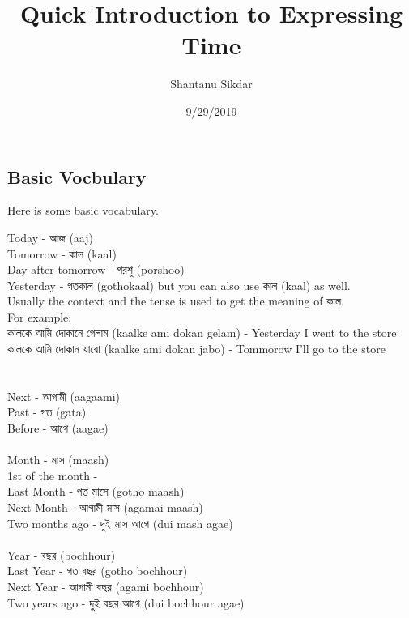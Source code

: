 \documentclass{article}
\title{ Quick Introduction to Expressing Time }
\author{Shantanu Sikdar}
\date{9/29/2019}
\begin{document}
\maketitle


\subsection{Basic Vocbulary}
Here is some basic vocabulary. 

Today - আজ  (aaj) \\
Tomorrow - কাল (kaal) \\
Day after tomorrow - পরশু (porshoo) \\
Yesterday - গতকাল (gothokaal) but you can also use কাল (kaal) as well. \\
Usually the context and the tense is used to get the meaning of কাল. \\
For example: \\
কালকে আমি দোকানে গেলাম (kaalke ami dokan gelam) - Yesterday I went to the store \\
কালকে আমি দোকান যাবো (kaalke ami dokan jabo) - Tommorow I'll go to the store \\
\\
\\
Next - আগামী (aagaami) \\
Past - গত (gata) \\
Before - আগে (aagae) \\
\\
Month - মাস (maash) \\
1st of the month - \\
Last Month - গত মাসে (gotho maash) \\
Next Month - আগামী মাস (agamai maash) \\
Two months ago - দুই মাস আগে (dui mash agae) \\
\\
Year - বছর (bochhour) \\
Last Year - গত বছর (gotho bochhour) \\
Next Year - আগামী বছর (agami bochhour) \\
Two years ago - দুই বছর আগে (dui bochhour agae) \\
\\
\end{document}
